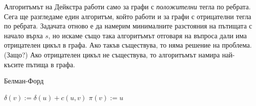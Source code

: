 Алгоритъмът на Дейкстра работи само за графи с {\em положителни} тегла по ребрата.
Сега ще разгледаме един алгоритъм, който работи и за графи с отрицателни тегла по ребрата.
Задачата отново е да намерим минималните разстояния на пътищата с начало върха $s$, но
искаме също така алгоритъмът отговаря на въпроса дали има отрицателен цикъл в графа. 
Ако такъв съществува, то няма решение на проблема. (Защо?)
Ако отрицателен цикъл не съществува, то алгоритъмът намира най-късите пътища в графа.


\begin{algorithm}
  \caption{Белман-Форд}
  \label{alg:belman-ford}
  
  \begin{algorithmic}[1]
    \STATE {}
    \STATE $\delta(v) := \delta(u) + c(u,v)$
    \STATE $\pi(v) := u$
    \ENDIF
    \ENDFOR
    \ENDFOR
    
    \RETURN \FALSE
    \ENDIF
    \ENDFOR
    \RETURN \TRUE
    
  \end{algorithmic}
\end{algorithm}


